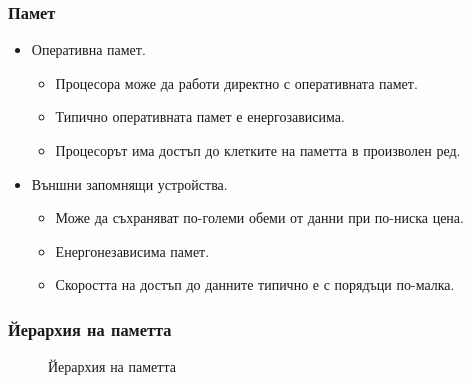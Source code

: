 \documentclass[ignorenonframetext, hyperref=unicode]{beamer}
\begin{document}
\begin{frame}
\frametitle{Памет}
\begin{itemize}
\item Оперативна памет.
\begin{itemize}
  \item Процесора може да работи директно с оперативната памет.
  \item Типично оперативната памет е енергозависима.
  \item Процесорът има достъп до клетките на паметта в произволен ред.
\end{itemize}
\item Външни запомнящи устройства.
\begin{itemize}
  \item Може да съхраняват по-големи обеми от данни при по-ниска цена.
  \item Енергонезависима памет.
  \item Скоростта на достъп до данните типично е с порядъци по-малка.
\end{itemize}
\end{itemize}
\end{frame}

\begin{frame}
\frametitle{Йерархия на паметта}
\begin{figure}[h]
\center
{}
\caption{Йерархия на паметта}
\end{figure}
\end{frame}
\end{document}

